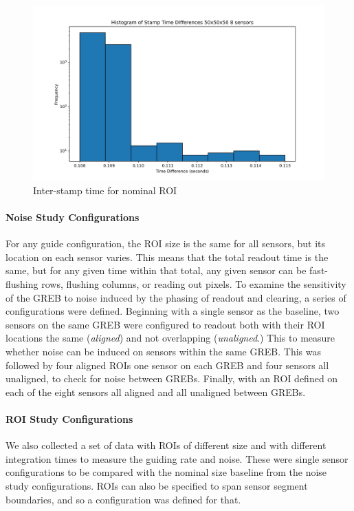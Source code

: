 \begin{figure}[ht]
    \centering
    \includegraphics[width=0.95\linewidth]{figures/guider_timing.png}
    \caption{Inter-stamp time for nominal ROI}
    \label{fig:guider_timing}
\end{figure}

\paragraph*{Noise Study Configurations}
For any guide configuration, the ROI size is the same for all sensors, but its location on each sensor varies. This means that the total readout time is the same, but for any given time within that total, any given sensor can be fast-flushing rows, flushing columns, or reading out pixels. To examine the sensitivity of the GREB to noise induced by the phasing of readout and clearing, a series of configurations were defined. Beginning with a single sensor as the baseline, two sensors on the same GREB were configured to readout both with their ROI locations the same (\textit{aligned}) and not overlapping (\textit{unaligned}.) This to measure whether noise can be induced on sensors within the same GREB. This was followed by four aligned ROIs one sensor on each GREB and four sensors all unaligned, to check for noise between GREBs. Finally, with an ROI defined on each of the eight sensors all aligned and all unaligned between GREBs.

\paragraph*{ROI Study Configurations}
We also collected a set of data with ROIs of different size and with different integration times to measure the guiding rate and noise. These were single sensor configurations to be compared with the nominal size baseline from the noise study configurations. ROIs can also be specified to span sensor segment boundaries, and so a configuration was defined for that.

